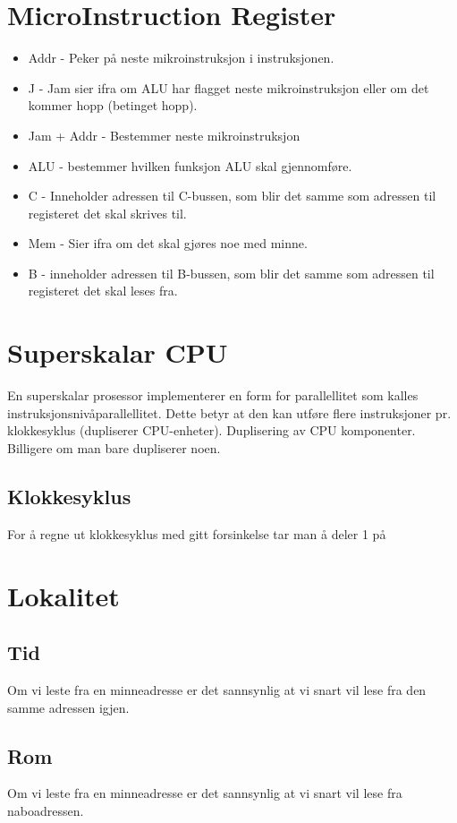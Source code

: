 \documentclass[a4paper, 10pt]{article}
\begin{document}
\section{MicroInstruction Register}
\begin{itemize}
	\item Addr - Peker på neste mikroinstruksjon i instruksjonen.
	\item J - Jam sier ifra om ALU har flagget neste mikroinstruksjon eller om det kommer hopp (betinget hopp).
	\item Jam + Addr - Bestemmer neste mikroinstruksjon
	\item ALU - bestemmer hvilken funksjon ALU skal gjennomføre.
	\item C - Inneholder adressen til C-bussen, som blir det samme som adressen til registeret det skal skrives til. 
	\item Mem - Sier ifra om det skal gjøres noe med minne.
	\item B - inneholder adressen til B-bussen, som blir det samme som adressen til registeret det skal leses fra.
\end{itemize}

\section{Superskalar CPU}
En superskalar prosessor implementerer en form for parallellitet som kalles instruksjonsnivåparallellitet. Dette betyr at den kan utføre flere instruksjoner pr. klokkesyklus (dupliserer CPU-enheter). Duplisering av CPU komponenter. Billigere om man bare dupliserer noen.

\subsection{Klokkesyklus}
For å regne ut klokkesyklus med gitt forsinkelse tar man å deler 1 på 

\section{Lokalitet}
\subsection{Tid}
Om vi leste fra en minneadresse er det sannsynlig at vi snart vil lese fra den samme adressen igjen.

\subsection{Rom}
Om vi leste fra en minneadresse er det sannsynlig at vi snart vil lese fra naboadressen.
\end{document}
